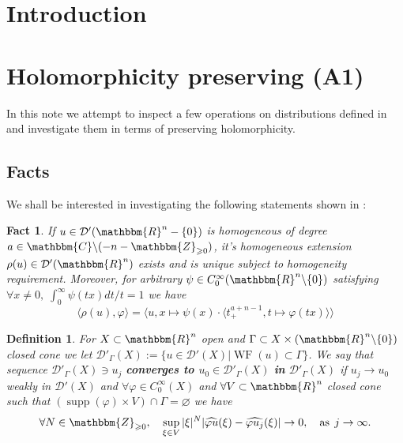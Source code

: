 \documentclass{article}
\newcommand{\assign}{:=}
\newcommand{\tmop}[1]{\ensuremath{\operatorname{#1}}}
\newcommand{\tmtextbf}[1]{{\bfseries{#1}}}
\newtheorem{definition}[proposition]{Definition}
\newtheorem{fact}[proposition]{Fact}
\theoremstyle{remark}
\begin{document}
\section{Introduction}

\section{Holomorphicity preserving (A1)}\label{sec:holomorphicity-preserving}

In this note we attempt to inspect a few operations on distributions defined
in {\cite{hormander1983analysis}} and investigate them in terms of preserving
holomorphicity.

\subsection{Facts}

We shall be interested in investigating the following statements shown in
{\cite{hormander1983analysis}}:

\begin{fact}
\label{holomorphicity-preserving:fact-homog}{\cite[thm.
3.2.3]{hormander1983analysis}} If $u \in \mathcal{D}' (\mathbbm{R}^n - \{ 0
\})$ is homogeneous of degree $a \in \mathbbm{C}\backslash (- n
-\mathbbm{Z}_{\geqslant 0})$, it's homogeneous extension $\rho (u) \in
\mathcal{D}' (\mathbbm{R}^n)$ exists and is unique subject to homogeneity
requirement. Moreover, for arbitrary $\psi \in C_0^{\infty} (\mathbbm{R}^n
\backslash \{ 0 \})$ satisfying $\forall x \neq 0, \; \int_0^{\infty} \psi (t
x) d t / t = 1$ we have
\[ \langle \rho (u), \varphi \rangle = \langle u, x \mapsto \psi (x) \cdot
   \langle t_+^{a + n - 1}, t \mapsto \varphi (t x) \rangle \rangle
\]
\end{fact}

\begin{definition}
  {\cite[sec. 8.2]{hormander1983analysis}} For $X \subset \mathbbm{R}^n$ open
  and $\Gamma \subset X \times (\mathbbm{R}^n \backslash \{ 0 \})$ closed cone
  we let $\mathcal{D}'_{\Gamma} (X) \assign \{ u \in \mathcal{D}' (X) |
  \tmop{WF} (u) \subset \Gamma \}$. We say that sequence
  $\mathcal{D}'_{\Gamma} (X) \ni u_j$ \tmtextbf{converges to }$u_0 \in
  \mathcal{D}'_{\Gamma} (X)$ \tmtextbf{in} $\mathcal{D}'_{\Gamma} (X)$ if $u_j
  \rightarrow u_0$ weakly in $\mathcal{D}' (X)$ and $\forall \varphi \in
  C_0^{\infty} (X)$ and $\forall V \subset \mathbbm{R}^n$ closed cone such
  that $(\tmop{supp} (\varphi) \times V) \cap \Gamma = \varnothing$ we have
  \[ \forall N \in \mathbbm{Z}_{\geqslant 0}, \quad \sup_{\xi \in V} | \xi |^N
     | \widehat{\varphi u} (\xi) - \widehat{\varphi u_j} (\xi) | \rightarrow
     0, \quad \tmop{as} \; j \rightarrow \infty . \]
\end{definition}
\end{document}
